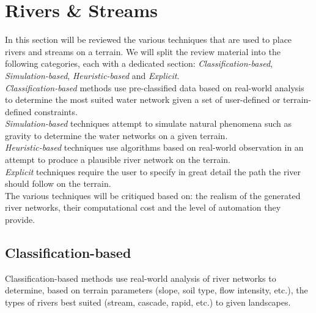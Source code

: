 \section{Rivers \& Streams}

In this section will be reviewed the various techniques that are used to place rivers and streams on a terrain. We will split the review material into the following categories, each with a dedicated section: \textit{Classification-based}, \textit{Simulation-based}, \textit{Heuristic-based} and \textit{Explicit}.\\ 
\textit{Classification-based} methods use pre-classified data based on real-world analysis to determine the most suited water network given a set of user-defined or terrain-defined constraints.\\
\textit{Simulation-based} techniques attempt to simulate natural phenomena such as gravity to determine the water networks on a given terrain.\\
\textit{Heuristic-based} techniques use algorithms based on real-world observation in an attempt to produce a plausible river network on the terrain. \\
\textit{Explicit} techniques require the user to specify in great detail the path the river should follow on the terrain.\\

The various techniques will be critiqued based on: the realism of the generated river networks, their computational cost and the level of automation they provide.

\subsection{Classification-based}

Classification-based methods use real-world analysis of river networks to determine, based on terrain parameters (slope, soil type, flow intensity, etc.), the types of rivers best suited (stream, cascade, rapid, etc.) to given landscapes.\\

